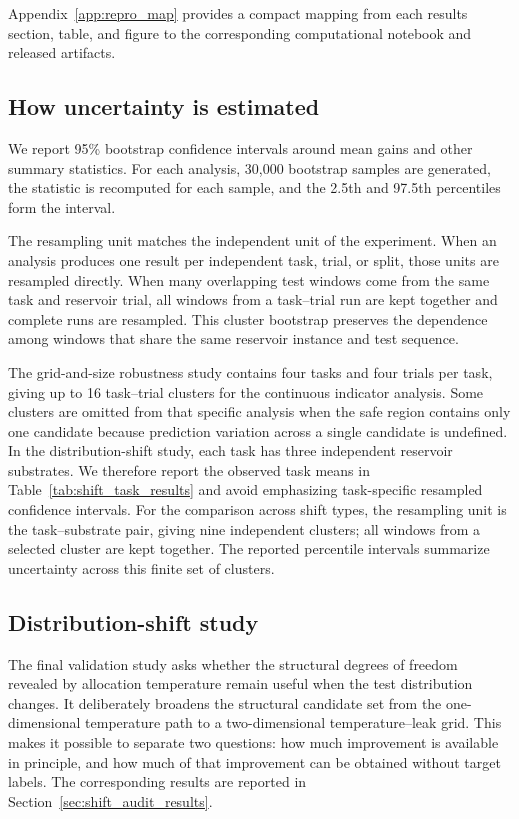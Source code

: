 \documentclass[preprint,12pt,authoryear]{elsarticle}
\begin{document}
Appendix~\ref{app:repro_map} provides a compact mapping from each results section, table, and figure to the corresponding computational notebook and released artifacts.

\subsection{How uncertainty is estimated}
\label{sec:uncertainty_methods}

We report 95\% bootstrap confidence intervals around mean gains and other summary statistics. For each analysis, 30,000 bootstrap samples are generated, the statistic is recomputed for each sample, and the 2.5th and 97.5th percentiles form the interval.

The resampling unit matches the independent unit of the experiment. When an analysis produces one result per independent task, trial, or split, those units are resampled directly. When many overlapping test windows come from the same task and reservoir trial, all windows from a task--trial run are kept together and complete runs are resampled. This cluster bootstrap preserves the dependence among windows that share the same reservoir instance and test sequence.

The grid-and-size robustness study contains four tasks and four trials per task, giving up to 16 task--trial clusters for the continuous indicator analysis. Some clusters are omitted from that specific analysis when the safe region contains only one candidate because prediction variation across a single candidate is undefined. In the distribution-shift study, each task has three independent reservoir substrates. We therefore report the observed task means in Table~\ref{tab:shift_task_results} and avoid emphasizing task-specific resampled confidence intervals. For the comparison across shift types, the resampling unit is the task--substrate pair, giving nine independent clusters; all windows from a selected cluster are kept together. The reported percentile intervals summarize uncertainty across this finite set of clusters.

\subsection{Distribution-shift study}
\label{sec:shift_audit_methods}

The final validation study asks whether the structural degrees of freedom revealed by allocation temperature remain useful when the test distribution changes. It deliberately broadens the structural candidate set from the one-dimensional temperature path to a two-dimensional temperature--leak grid. This makes it possible to separate two questions: how much improvement is available in principle, and how much of that improvement can be obtained without target labels. The corresponding results are reported in Section~\ref{sec:shift_audit_results}.
\end{document}
